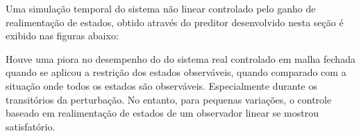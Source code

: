     Uma simulação temporal do sistema não linear controlado pelo ganho de realimentação de estados, obtido através do preditor desenvolvido nesta seção é exibido nas figuras abaixo:

    Houve uma piora no desempenho do do sistema real controlado em malha fechada quando se aplicou a restrição dos estados observáveis, quando comparado com a situação onde todos os estados são observáveis. Especialmente durante os transitórios da perturbação. No entanto, para pequenas variações, o controle baseado em realimentação de estados de um observador linear se mostrou satisfatório.
    